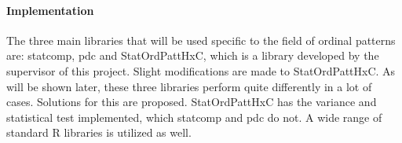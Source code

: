 \paragraph{Implementation}
The three main libraries that will be used specific to the field of ordinal patterns are: statcomp\cite{statcomp}, pdc\cite{pdc} and StatOrdPattHxC, which is a library developed by the supervisor of this project. Slight modifications are made to StatOrdPattHxC. As will be shown later, these three libraries perform quite differently in a lot of cases. Solutions for this are proposed. StatOrdPattHxC has the variance and statistical test implemented, which statcomp and pdc do not. A wide range of standard R libraries is utilized as well.